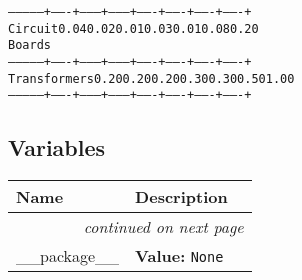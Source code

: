 \begin{boxedminipage}{\funcwidth}
\begin{alltt}
--------------+-------+--------+--------+-------+-------+-------+-------+
Circuit       {\textbar} 0.04  {\textbar}  0.02  {\textbar}  0.01  {\textbar} 0.03  {\textbar} 0.01  {\textbar} 0.08  {\textbar} 0.20  {\textbar}
Boards        {\textbar}       {\textbar}        {\textbar}        {\textbar}       {\textbar}       {\textbar}       {\textbar}       {\textbar}
--------------+-------+--------+--------+-------+-------+-------+-------+
Transformers  {\textbar} 0.20  {\textbar}  0.20  {\textbar}  0.20  {\textbar} 0.30  {\textbar} 0.30  {\textbar} 0.50  {\textbar} 1.00  {\textbar}
--------------+-------+--------+--------+-------+-------+-------+-------+
\end{alltt}

\setlength{\parskip}{1ex}
    \end{boxedminipage}



  \subsection{Variables}

    \vspace{-1cm}
\hspace{\varindent}\begin{longtable}{|p{\varnamewidth}|p{\vardescrwidth}|l}
\cline{1-2}
\cline{1-2} \centering \textbf{Name} & \centering \textbf{Description}& \\
\cline{1-2}
\endhead\cline{1-2}\multicolumn{3}{r}{\small\textit{continued on next page}}\\\endfoot\cline{1-2}
\endlastfoot\raggedright \_\-\_\-p\-a\-c\-k\-a\-g\-e\-\_\-\_\- & \raggedright \textbf{Value:} 
{\tt None}&\\
\cline{1-2}
\end{longtable}

